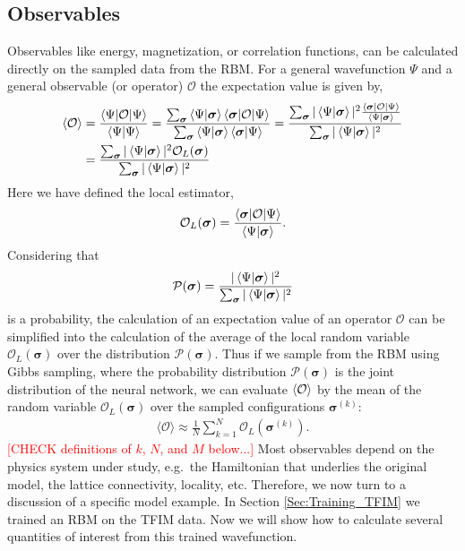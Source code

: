 \documentclass[submission, Phys]{SciPost}
\begin{document}
\subsection{Observables}
\label{Sec:Observables}

Observables like energy, magnetization, or correlation functions, can be calculated directly on the sampled data from the RBM. 
For a general wavefunction $\Psi$ and a general observable (or operator) $\mathcal{O}$ the expectation value is given by,
\begin{align}
\braket{\mathcal{O}} &= \frac{\braket{\Psi | \mathcal{O} | \Psi}}{\braket{\Psi | \Psi}} = \frac{\sum_{\bm{\sigma}} \braket{\Psi | {\bm{\sigma}}} \braket{{\bm{\sigma}} | \mathcal{O} | \Psi}}{\sum_{\bm{\sigma}} \braket{\Psi | {\bm{\sigma}}} \braket{{\bm{\sigma}} | \Psi}} = \frac{\sum_{\bm{\sigma}} | \braket{\Psi | {\bm{\sigma}}} |^2 \frac{\braket{{\bm{\sigma}} | \mathcal{O} | \Psi}}{\braket{\Psi | {\bm{\sigma}}}} }{\sum_{\bm{\sigma}}  | \braket{\Psi | {\bm{\sigma}}} |^2} \\
&= \frac{\sum_{\bm{\sigma}} | \braket{\Psi | {\bm{\sigma}}} |^2 \mathcal{O}_L({\bm{\sigma}}) }{\sum_{\bm{\sigma}}  | \braket{\Psi | {\bm{\sigma}}} |^2} 
\end{align}
Here we have defined the local estimator,
\begin{equation}
\mathcal{O}_L({\bm{\sigma}}) =  \frac{\braket{{\bm{\sigma}} | \mathcal{O} | \Psi}}{\braket{\Psi | {\bm{\sigma}}}} .
\end{equation}
Considering that
\begin{equation}
\mathcal{P}({\bm{\sigma}}) = \frac{ | \braket{\Psi | {\bm{\sigma}}} |^2  }{\sum_{\bm{\sigma}}  | \braket{\Psi | {\bm{\sigma}}} |^2} 
\end{equation}
is a probability, the calculation of an expectation value of an operator $\mathcal{O}$ can be simplified into the calculation of  the average of the local random variable $\mathcal{O}_L({\bm{\sigma}})$ over the distribution $\mathcal{P}({\bm{\sigma}})$.
Thus if we sample from the RBM using Gibbs sampling,
where the probability distribution $\mathcal{P}({\bm{\sigma}})$ is the joint distribution of the neural network,
we can evaluate $\braket{\mathcal{O}}$ by the mean of the random variable $\mathcal{O}_L({\bm{\sigma}})$ over the 
sampled configurations ${\bm{\sigma}^{(k)}}$:
\begin{align}
\label{Eq:}
\mathcal{\langle O \rangle} \approx \frac{1}{N} \sum_{k=1}^N \mathcal{O}_L({\bm{\sigma}}^{(k)}).
\end{align}
\textcolor{red}{[CHECK definitions of $k$, $N$, and $M$ below...]}
Most observables depend on the physics system under study, e.g.~the Hamiltonian that underlies the original model, the lattice connectivity, locality, etc.  Therefore, we now turn to a discussion of a specific model example. In Section \ref{Sec:Training_TFIM} we trained an RBM on the TFIM data. Now we will show how to calculate several quantities of interest from this trained wavefunction.
\end{document}
